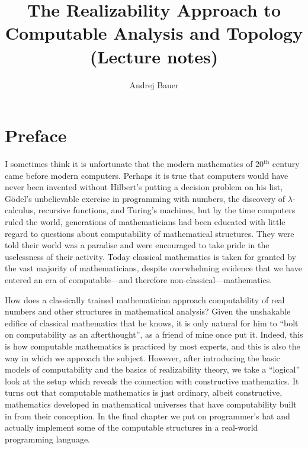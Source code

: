 \documentclass[11pt,a4paper,twoside]{book}
\begin{document}
\title{
  The Realizability Approach to\\
  Computable Analysis and Topology\\
  (Lecture notes)
}

\author{Andrej Bauer}

\maketitle


\chapter*{Preface}

I sometimes think it is unfortunate that the modern mathematics of
20${}^{\text{th}}$ century came before modern computers. Perhaps it is
true that computers would have never been invented without Hilbert's
putting a decision problem on his list, G\"odel's unbelievable
exercise in programming with numbers, the discovery of
$\lambda$-calculus, recursive functions, and Turing's machines, but by
the time computers ruled the world, generations of mathematicians had
been educated with little regard to questions about computability of
mathematical structures. They were told their world was a paradise and
were encouraged to take pride in the uselessness of their activity.
Today classical mathematics is taken for granted by the vast majority
of mathematicians, despite overwhelming evidence that we have entered
an era of computable---and therefore non-classical---mathematics.

How does a classically trained mathematician approach computability of
real numbers and other structures in mathematical analysis? Given the
unshakable edifice of classical mathematics that he knows, it is only
natural for him to ``bolt on computability as an afterthought'', as a
friend of mine once put it. Indeed, this is how computable mathematics
is practiced by most experts, and this is also the way in which we
approach the subject. However, after introducing the basic models of
computability and the basics of realizability theory, we take a
``logical'' look at the setup which reveals the connection with
constructive mathematics. It turns out that computable mathematics is
just ordinary, albeit constructive, mathematics developed in
mathematical universes that have computability built in from their
conception. In the final chapter we put on programmer's hat and
actually implement some of the computable structures in a real-world
programming language.
\end{document}
